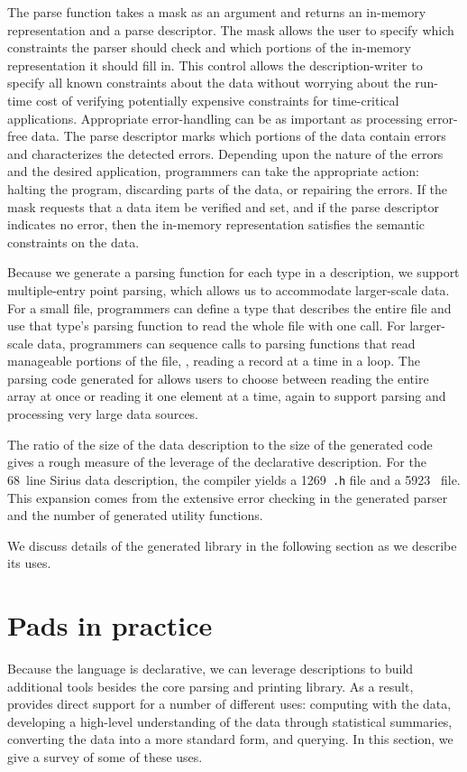 \documentclass{sig-alternate}
\newcommand{\dibbler}{Sirius}
\begin{document}
The parse function takes a mask as an argument and returns an
in-memory representation and a parse descriptor.  
The mask allows the user to specify 
which constraints the parser should check and which portions of the
in-memory representation it should fill in.  This control allows the
description-writer to specify all known constraints about the data
without worrying about the run-time cost of verifying potentially
expensive constraints for time-critical applications.
Appropriate error-handling can be as important as processing
error-free data.  The parse descriptor marks which portions of the
data contain errors and characterizes the detected errors.
Depending upon the nature of the errors and the desired application,
programmers can take the appropriate action: halting the program,
discarding parts of the data, or repairing the errors.
If the mask requests
that a data item be verified and set, and if the parse descriptor
indicates no error, then the in-memory representation satisfies the
semantic constraints on the data.

Because we generate a parsing function for each type in a \pads{} description,
we support multiple-entry point parsing, which allows us to 
accommodate larger-scale data.
For a small file, programmers can define a \pads{} type that describes
the entire file and use that type's parsing function to read the whole
file with one call.  For larger-scale data, programmers can sequence
calls to parsing functions that read manageable portions of the file,
\eg{}, reading a record at a time in a loop.  The parsing code generated
for  allows users to choose between reading the entire array
at once or reading it one element at a time, again to support parsing
and processing very large data sources.

The ratio of the size of the data description to the size of the generated code gives a rough measure of the leverage of the
declarative description.  For the 
68~line \dibbler{} data description, the compiler yields a 1269~\texttt{.h} file
and a 5923~ file.  This expansion comes from the extensive error checking in the generated parser and the number of generated utility functions.

We discuss details of the generated library in the following section
as we describe its uses.

\section{Pads in practice}
Because the \pads{} language is declarative, we can leverage \pads{}
descriptions to build additional tools besides the core parsing and printing
library.  As a result, \pads{} provides direct support for a number
of different uses: computing with the data, developing a high-level
understanding of the data through statistical summaries, converting the data into a more standard form, and querying.  In this section, we give a survey of some of these uses.
\end{document}
